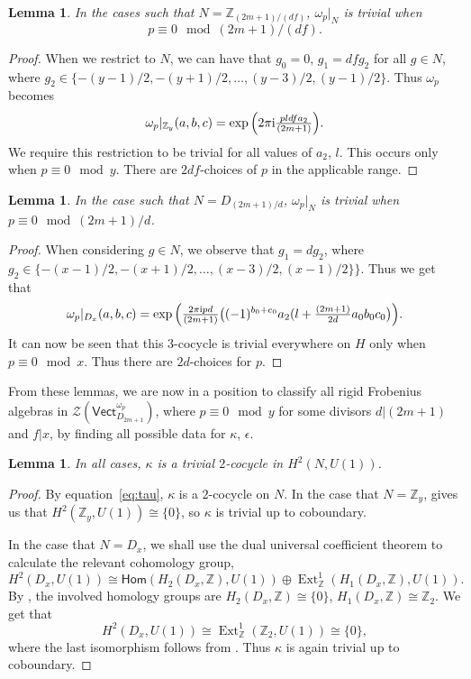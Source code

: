 \documentclass[pdftex]{sigma}
\numberwithin{equation}{section}
\newtheorem{Lemma}[Theorem]{Lemma}
\newcommand{\Ext}{\operatorname{Ext}}
\newcommand{\Hom}{\mathsf{Hom}}
\newcommand{\Vect}{\mathsf{Vect}}
\newcommand{\mZ}{\mathbb{Z}}
\newcommand{\cZ}{\mathcal{Z}}
\begin{document}
\begin{Lemma}
 In the cases such that $N= \mZ_{(2m+1)/(df)}$, $\omega_p|_N$ is trivial when
 \[p\equiv 0 \mod (2m+1)/(df).\]
\end{Lemma}
\begin{proof}
When we restrict to $N$, we can have that $g_0=0$, $g_1 = df g_2$ for all $g\in N$, where $g_2\in \lbrace -(y-1)/2, -(y+1)/2,\dots ,(y-3)/2 ,(y-1)/2 \rbrace$. Thus $\omega_p$ becomes \[\omega_p|_{\mZ_y}(a,b,c) = \exp\Big(2 \pi {\rm i}\tfrac{p l d f a_2}{(2m+1)} \Big).
\]
We require this restriction to be trivial for all values of $a_2$, $l$. This occurs only when $p\equiv 0 \mod y$. There are $2df$-choices of $p$ in the applicable range.
\end{proof}

\begin{Lemma}
In the case such that $N= D_{(2m+1)/d}$, $\omega_p|_N$ is trivial when $p\equiv 0 \mod (2m+1)/d$.
\end{Lemma}

\begin{proof} When considering $g\in N$, we observe that $g_1 = dg_2$, where $g_2\in \lbrace -(x-1)/2, -(x+1)/2,\dots ,(x-3)/2 ,(x-1)/2 \rbrace \rbrace$.
 Thus we get that
 \begin{equation*}
 \omega_p|_{D_x}(a,b,c) =\exp\Big(\tfrac{2\pi {\rm i} p d}{(2m+1)}\big((-1)^{b_0+c_0}a_2(l + \tfrac{(2m+1)}{2 d}a_0b_0c_0\big) \Big).
 \end{equation*}
 It can now be seen that this $3$-cocycle is trivial everywhere on $H$ only when $p\equiv 0 \mod x$. Thus there are $2d$-choices for $p$.
\end{proof}

From these lemmas, we are now in a position to classify all rigid Frobenius algebras in $\cZ(\Vect^{\omega_p}_{D_{2m+1}})$, where $p \equiv 0 \mod y$ for some divisors $d|(2m+1)$ and $f|x$, by finding all possible data for $\kappa$, $\epsilon$.
\begin{Lemma}
 In all cases, $\kappa$ is a trivial $2$-cocycle in $H^2(N,U(1))$.
\end{Lemma}
\begin{proof}
 By equation~\eqref{eq:tau}, $\kappa$ is a $2$-cocycle on $N$. In the case that $N=\mZ_{y}$, \cite[equation~2.3.14]{dWP} gives us that $H^2(\mZ_y,U(1)) \cong \{0\}$, so $\kappa$ is trivial up to coboundary.

In the case that $N=D_x$, we shall use the dual universal coefficient theorem \cite[Theorem~3.6.5]{Wei} to calculate the relevant cohomology group,
 \[H^2(D_x,U(1)) \cong \Hom(H_2(D_x,\mZ),U(1)) \oplus \Ext^1_{\mZ}(H_1(D_x,\mZ),U(1)).\]
By \cite[Example~6.8.5]{Wei}, the involved homology groups are $H_2(D_x,\mZ) \cong \lbrace 0 \rbrace$, $H_1(D_x,\mZ) \cong \mZ_2$. We get that \[H^2(D_x,U(1)) \cong \Ext^1_{\mZ}(\mZ_2,U(1)) \cong \lbrace 0\rbrace,\]
where the last isomorphism follows from \cite[Corollary 3.3.11]{Wei}. Thus $\kappa$ is again trivial up to coboundary.
\end{proof}
\end{document}
